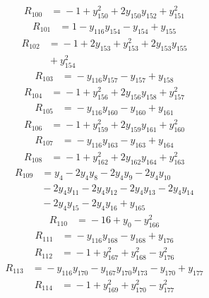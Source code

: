 \begin{align*}
R_{100} &={} -1 +y_{150}^{2} +2y_{150}y_{152} +y_{151}^{2}
\end{align*}
\begin{align*}
R_{101} &={} 1 -y_{116}y_{154} -y_{154} +y_{155}
\end{align*}
\begin{align*}
R_{102} &={} -1 +2y_{153} +y_{153}^{2} +2y_{153}y_{155} \\
 &{} +y_{154}^{2}
\end{align*}
\begin{align*}
R_{103} &={} -y_{116}y_{157} -y_{157} +y_{158}
\end{align*}
\begin{align*}
R_{104} &={} -1 +y_{156}^{2} +2y_{156}y_{158} +y_{157}^{2}
\end{align*}
\begin{align*}
R_{105} &={} -y_{116}y_{160} -y_{160} +y_{161}
\end{align*}
\begin{align*}
R_{106} &={} -1 +y_{159}^{2} +2y_{159}y_{161} +y_{160}^{2}
\end{align*}
\begin{align*}
R_{107} &={} -y_{116}y_{163} -y_{163} +y_{164}
\end{align*}
\begin{align*}
R_{108} &={} -1 +y_{162}^{2} +2y_{162}y_{164} +y_{163}^{2}
\end{align*}
\begin{align*}
R_{109} &={} y_{4} -2y_{4}y_{8} -2y_{4}y_{9} -2y_{4}y_{10} \\
 &{} -2y_{4}y_{11} -2y_{4}y_{12} -2y_{4}y_{13} -2y_{4}y_{14} \\
 &{} -2y_{4}y_{15} -2y_{4}y_{16} +y_{165}
\end{align*}
\begin{align*}
R_{110} &={} -16 +y_{0} -y_{166}^{2}
\end{align*}
\begin{align*}
R_{111} &={} -y_{116}y_{168} -y_{168} +y_{176}
\end{align*}
\begin{align*}
R_{112} &={} -1 +y_{167}^{2} +y_{168}^{2} -y_{176}^{2}
\end{align*}
\begin{align*}
R_{113} &={} -y_{116}y_{170} -y_{167}y_{170}y_{173} -y_{170} +y_{177}
\end{align*}
\begin{align*}
R_{114} &={} -1 +y_{169}^{2} +y_{170}^{2} -y_{177}^{2}
\end{align*}

